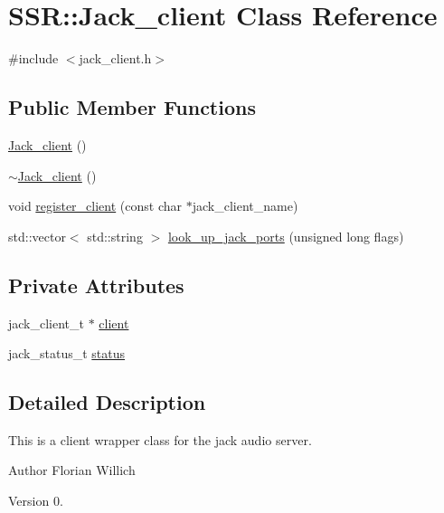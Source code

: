 \hypertarget{classSSR_1_1Jack__client}{\section{S\-S\-R\-:\-:Jack\-\_\-client Class Reference}
\label{classSSR_1_1Jack__client}
}


{\ttfamily \#include $<$jack\-\_\-client.\-h$>$}

\subsection*{Public Member Functions}
\begin{DoxyCompactItemize}
\item 
\hyperlink{classSSR_1_1Jack__client_aa9235ed1d957f0dec80012cc9c7c2a80}{Jack\-\_\-client} ()
\item 
\hyperlink{classSSR_1_1Jack__client_a6525774ad921e067c8f4cafe3e0998e8}{$\sim$\-Jack\-\_\-client} ()
\item 
void \hyperlink{classSSR_1_1Jack__client_adaa47a4feebb858ea07ad64328794b3a}{register\-\_\-client} (const char $\ast$jack\-\_\-client\-\_\-name)
\item 
std\-::vector$<$ std\-::string $>$ \hyperlink{classSSR_1_1Jack__client_ad5883392dffbd3ea4b4f54d6f51b88ad}{look\-\_\-up\-\_\-jack\-\_\-ports} (unsigned long flags)
\end{DoxyCompactItemize}
\subsection*{Private Attributes}
\begin{DoxyCompactItemize}
\item 
jack\-\_\-client\-\_\-t $\ast$ \hyperlink{classSSR_1_1Jack__client_ac8e23397794574f1066ee78c69c08f58}{client}
\item 
jack\-\_\-status\-\_\-t \hyperlink{classSSR_1_1Jack__client_a0e34088a4eaa840399ce372195ee9839}{status}
\end{DoxyCompactItemize}


\subsection{Detailed Description}
This is a client wrapper class for the jack audio server.

\begin{DoxyAuthor}{Author}
Florian Willich 
\end{DoxyAuthor}
\begin{DoxyVersion}{Version}
0. 
\end{DoxyVersion}


